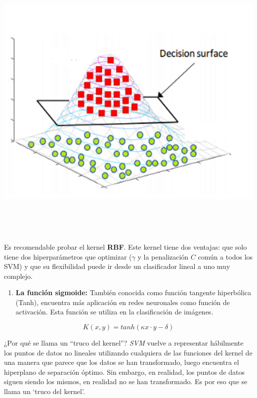\documentclass[
]{book}
\providecommand{\tightlist}{%
  \setlength{\itemsep}{0pt}\setlength{\parskip}{0pt}}
\begin{document}
\begin{center}\includegraphics[width=400pt,height=400pt]{img/02-svm/svm_radial} \end{center}

Es recomendable probar el kernel \textbf{RBF}. Este kernel tiene dos ventajas: que solo tiene dos hiperparámetros que optimizar (\(\gamma\) y la penalización \(C\) común a todos los SVM) y que su flexibilidad puede ir desde un clasificador lineal a uno muy complejo.

\begin{enumerate}
\def\labelenumi{\arabic{enumi}.}
\setcounter{enumi}{3}
\tightlist
\item
  \textbf{La función sigmoide:} También conocida como función tangente hiperbólica (Tanh), encuentra más aplicación en redes neuronales como función de activación. Esta función se utiliza en la clasificación de imágenes.
\end{enumerate}

\[K(x, y)= tanh(\kappa x\cdot y-\delta)\]

¿Por qué se llama un ``truco del kernel''? \emph{SVM} vuelve a representar hábilmente los puntos de datos no lineales utilizando cualquiera de las funciones del kernel de una manera que parece que los datos se han transformado, luego encuentra el hiperplano de separación óptimo. Sin embargo, en realidad, los puntos de datos siguen siendo los mismos, en realidad no se han transformado. Es por eso que se llama un `truco del kernel'.
\end{document}
